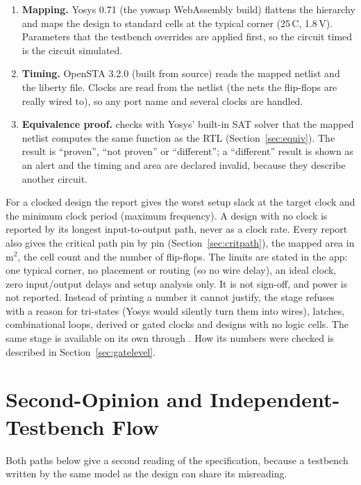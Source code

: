 \begin{enumerate}[label=\textbf{\arabic*.}]
\item \textbf{Mapping.} Yosys 0.71 (the yowasp WebAssembly build) flattens the
hierarchy and maps the design to  standard cells at the
typical corner (25\,\textdegree C, 1.8\,V). Parameters that the testbench overrides
are applied first, so the circuit timed is the circuit simulated.
\item \textbf{Timing.} OpenSTA 3.2.0 (built from source) reads the mapped netlist and
the liberty file. Clocks are read from the netlist (the nets the flip-flops are
really wired to), so any port name and several clocks are handled.
\item \textbf{Equivalence proof.}  checks with Yosys' built-in
SAT solver that the mapped netlist computes the same function as the RTL
(Section~\ref{sec:equiv}). The result is ``proven'', ``not proven'' or
``different''; a ``different'' result is shown as an alert and the timing and area
are declared invalid, because they describe another circuit.
\end{enumerate}

For a clocked design the report gives the worst setup slack at the target clock and
the minimum clock period (maximum frequency). A design with no clock is reported by
its longest input-to-output path, never as a clock rate. Every report also gives the
critical path pin by pin (Section~\ref{sec:critpath}), the mapped area in \textmu m$^2$, the cell count and the number of
flip-flops. The limits are stated in the app: one typical corner, no placement or
routing (so no wire delay), an ideal clock, zero input/output delays and setup
analysis only. It is not sign-off, and power is not reported. Instead of printing
a number it cannot justify, the stage refuses with a reason for tri-states (Yosys
would silently turn them into wires), latches, combinational loops, derived or gated
clocks and designs with no logic cells. The same stage is available on its own
through . How its numbers were checked is described in
Section~\ref{sec:gatelevel}.

\section{Second-Opinion and Independent-Testbench Flow}
\label{sec:secondarch}
Both paths below give a second reading of the specification, because a testbench
written by the same model as the design can share its misreading.

